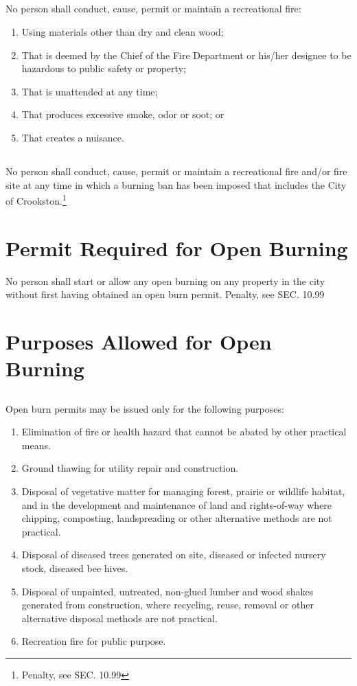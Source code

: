 \subsection{}
No person shall conduct, cause, permit or maintain a recreational fire:
\begin{enumerate}[{\indent}1)]
    \item Using materials other than dry and clean wood;
    \item That is deemed by the Chief of the Fire Department or his/her designee to be hazardous to public safety or property;
    \item That is unattended at any time;
    \item That produces excessive smoke, odor or soot; or
    \item That creates a nuisance.
\end{enumerate}
\subsection{}
No person shall conduct, cause, permit or maintain a recreational fire and/or fire site at any time in which a burning ban has been imposed that includes the City of Crookston.\footnote{Penalty, see SEC. 10.99}
\section{Permit Required for Open Burning}
No person shall start or allow any open burning on any property in the city without first having obtained an open burn permit.
Penalty, see SEC. 10.99
\section{Purposes Allowed for Open Burning}
\subsection{}
Open burn permits may be issued only for the following purposes:
\begin{enumerate}[{\indent}1)]
    \item Elimination of fire or health hazard that cannot be abated by other practical means.
    \item Ground thawing for utility repair and construction.
    \item Disposal of vegetative matter for managing forest, prairie or wildlife habitat, and in the development and maintenance of land and rights-of-way where chipping, composting, landspreading or other alternative methods are not practical.
    \item Disposal of diseased trees generated on site, diseased or infected nursery stock, diseased bee hives.
    \item Disposal of unpainted, untreated, non-glued lumber and wood shakes generated from construction, where recycling, reuse, removal or other alternative disposal methods are not practical.
    \item Recreation fire for public purpose.
\end{enumerate}
